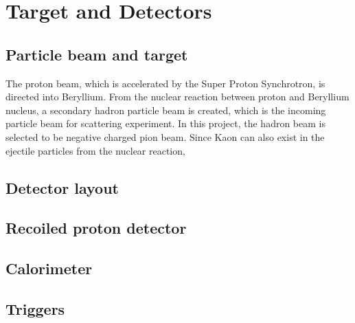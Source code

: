 \section{Target and Detectors}
\subsection{Particle beam and target}
The proton beam, which is accelerated by the Super Proton Synchrotron, is directed into Beryllium. From the nuclear reaction between proton and Beryllium nucleus, a secondary hadron particle beam is created, which is the incoming particle beam for scattering experiment. In this project, the hadron beam is selected to be negative charged pion beam. Since Kaon can also exist in the ejectile particles from the nuclear reaction, 
\subsection{Detector layout}
\subsection{Recoiled proton detector}
\subsection{Calorimeter}
\subsection{Triggers}
